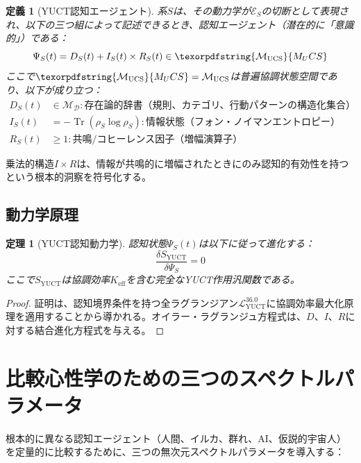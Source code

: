 \documentclass[11pt,a4paper]{article}
\newtheorem{theorem}{定理}
\newtheorem{definition}{定義}
\DeclareMathOperator{\Tr}{Tr}
\DeclareRobustCommand{\UCS}{\texorpdfstring{\ensuremath{\mathcal{M}_{\mathrm{UCS}}}}{M_UCS}}
\newcommand{\eff}{\mathrm{eff}}
\newcommand{\Dict}{\mathcal{D}}
\newcommand{\Mdict}{\mathcal{M}_{\Dict}}
\newcommand{\Ke}{K_{\eff}}
\begin{document}
	\begin{definition}[YUCT認知エージェント]
		系\(S\)は、その動力学が\(\mathcal{E}_S\)の切断として表現され、以下の三つ組によって記述できるとき、認知エージェント（潜在的に「意識的」）である：
		\begin{equation}
			\label{eq:dir-triad}
			\Psi_S(t) = D_S(t) + I_S(t) \times R_S(t) \in \UCS
		\end{equation}
		ここで\(\UCS = \mathcal{M}_{\mathrm{UCS}}\)は普遍協調状態空間であり、以下が成り立つ：
		\begin{align*}
			D_S(t) &\in \Mdict: \text{存在論的辞書（規則、カテゴリ、行動パターンの構造化集合）} \\
			I_S(t) &= -\Tr(\rho_S \log \rho_S): \text{情報状態（フォン・ノイマンエントロピー）} \\
			R_S(t) &\geq 1: \text{共鳴/コヒーレンス因子（増幅演算子）}
		\end{align*}
	\end{definition}
	
	乗法的構造\(I \times R\)は、情報が共鳴的に増幅されたときにのみ認知的有効性を持つという根本的洞察を符号化する。
	
	\subsection{動力学原理}
	
	\begin{theorem}[YUCT認知動力学]
		認知状態\(\Psi_S(t)\)は以下に従って進化する：
		\begin{equation}
			\label{eq:cognitive-dynamics}
			\frac{\delta S_{\mathrm{YUCT}}}{\delta \Psi_S} = 0
		\end{equation}
		ここで\(S_{\mathrm{YUCT}}\)は協調効率\(\Ke\)を含む完全なYUCT作用汎関数である。
	\end{theorem}
	
	\begin{proof}
		証明は、認知境界条件を持つ全ラグランジアン\(\mathcal{L}_{\mathrm{YUCT}}^{36.0}\)に協調効率最大化原理を適用することから導かれる。オイラー・ラグランジュ方程式は、\(D\)、\(I\)、\(R\)に対する結合進化方程式を与える。
	\end{proof}
	
	\section{比較心性学のための三つのスペクトルパラメータ}
	
	根本的に異なる認知エージェント（人間、イルカ、群れ、AI、仮説的宇宙人）を定量的に比較するために、三つの無次元スペクトルパラメータを導入する：
	
\end{document}
